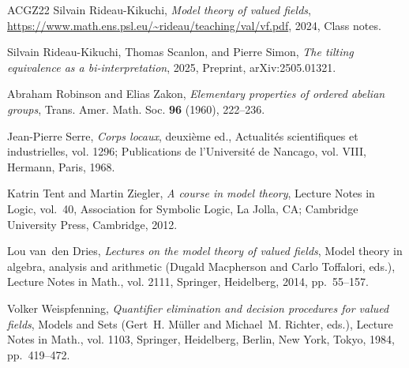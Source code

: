 \documentclass[a4paper]{amsart}
\theoremstyle{mystyle2}
\theoremstyle{mystyle}
\numberwithin{equation}{section}
\begin{document}
\begin{thebibliography}{ACGZ22}
		Silvain Rideau-Kikuchi, \emph{Model theory of valued fields},
		\url{https://www.math.ens.psl.eu/~rideau/teaching/val/vf.pdf}, 2024, Class
		notes.
		
		Silvain Rideau-Kikuchi, Thomas Scanlon, and Pierre Simon, \emph{The tilting
			equivalence as a bi-interpretation}, 2025, Preprint, arXiv:2505.01321.
		
		Abraham Robinson and Elias Zakon, \emph{Elementary properties of ordered
			abelian groups}, Trans. Amer. Math. Soc. \textbf{96} (1960), 222--236.
		
		Jean-Pierre Serre, \emph{Corps locaux}, deuxi\`eme ed., Actualit\'es
		scientifiques et industrielles, vol. 1296; Publications de l'Universit\'e de
		Nancago, vol. VIII, Hermann, Paris, 1968.
		
		Katrin Tent and Martin Ziegler, \emph{A course in model theory}, Lecture Notes
		in Logic, vol.~40, Association for Symbolic Logic, La Jolla, CA; Cambridge
		University Press, Cambridge, 2012.
		
		Lou van~den Dries, \emph{Lectures on the model theory of valued fields}, Model
		theory in algebra, analysis and arithmetic (Dugald Macpherson and Carlo
		Toffalori, eds.), Lecture Notes in Math., vol. 2111, Springer, Heidelberg,
		2014, pp.~55--157.
		
		Volker Weispfenning, \emph{Quantifier elimination and decision procedures for
			valued fields}, Models and Sets (Gert~H. M\"uller and Michael~M. Richter,
		eds.), Lecture Notes in Math., vol. 1103, Springer, Heidelberg, Berlin, New
		York, Tokyo, 1984, pp.~419--472.
		
	\end{thebibliography}
    
\end{document}
